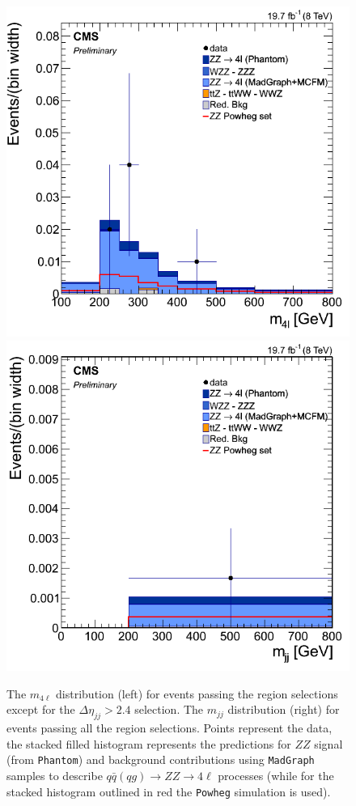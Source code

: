 \begin{figure}[hbtp]
  \begin{center}
    \includegraphics[width=\cmsFigWidth]{Figures/Mass_pt100pt70_met60_mjj200_mad.png}     
    \includegraphics[width=\cmsFigWidth]{Figures/Mjj_pt100pt70_met60_deta24_mad.png}     
       \caption{The $m_{4\ell}$ distribution (left) for events passing the region selections except for the $\Delta\eta_{jj} > 2.4$ selection. The $m_{jj}$ distribution (right) for events passing all the region selections. Points represent the data, the stacked filled histogram represents the predictions for $ZZ$ signal (from \texttt{Phantom}) and background contributions using \texttt{MadGraph} samples to describe $q\bar{q}(qg)\to ZZ\to 4\ell$ processes (while for the stacked histogram outlined in red the \texttt{Powheg} simulation is used).}
    \label{fig:ewk_distr}
  \end{center}
\end{figure}

